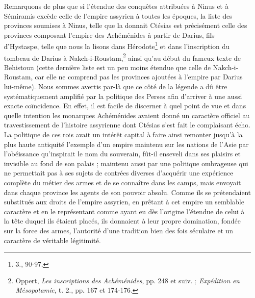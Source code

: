 \documentclass[a4paper, 11pt, oneside]{article}
\begin{document}
Remarquons de plus que si l'étendue des conquêtes attribuées à Ninus et à Sémiramis excède celle de l'empire assyrien à toutes les époques, la liste des provinces soumises à Ninus, telle que la donnait Ctésias est précisément celle des provinces composant l'empire des Achéménides à partir de Darius, fils d'Hystaspe, telle que nous la lisons dans Hérodote\footnote{3., 90-97.} et dans l'inscription du tombeau de Darius à Nakch-i-Roustam,\footnote{Oppert, \emph{Les inscriptions des Achéménides}, pp. 248 et suiv. ; \emph{Expédition en Mésopotamie}, t. 2., pp. 167 et 174-176.} ainsi qu'au début du fameux texte de Behistoun (cette dernière liste est un peu moins étendue que celle de Nakch-i-Roustam, car elle ne comprend pas les provinces ajoutées à l'empire par Darius lui-même). Nous sommes avertis par-là que ce côté de la légende a dû être systématiquement amplifié par la politique des Perses afin d'arriver à une aussi exacte coïncidence. En effet, il est facile de discerner à quel point de vue et dans quelle intention les monarques Achéménides avaient donné un caractère officiel au travestissement de l'histoire assyrienne dont Ctésias s'est fait le complaisant écho. La politique de ces rois avait un intérêt capital à faire ainsi remonter jusqu'à la plus haute antiquité l'exemple d'un empire maintenu sur les nations de l'Asie par l'obéissance qu'inspirait le nom du souverain, fût-il enseveli dans ses plaisirs et invisible au fond de son palais ; maintenu aussi par une politique ombrageuse qui ne permettait pas à ses sujets de contrées diverses d'acquérir une expérience complète du métier des armes et de se connaître dans les camps, mais envoyait dans chaque province les agents de son pouvoir absolu. Comme ils se prétendaient substitués aux droits de l'empire assyrien, en prêtant à cet empire un semblable caractère et en le représentant comme ayant eu dès l'origine l'étendue de celui à la tête duquel ils étaient placés, ils donnaient à leur propre domination, fondée sur la force des armes, l'autorité d'une tradition bien des fois séculaire et un caractère de véritable légitimité.
\end{document}

